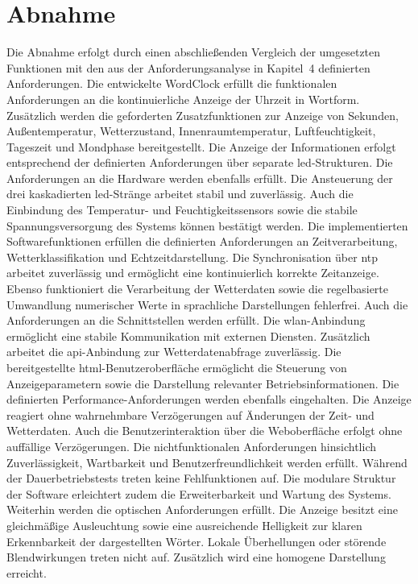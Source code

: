\section{Abnahme}
Die Abnahme erfolgt durch einen abschließenden Vergleich der umgesetzten Funktionen mit den aus der Anforderungsanalyse in Kapitel~4 definierten Anforderungen.
Die entwickelte WordClock erfüllt die funktionalen Anforderungen an die kontinuierliche Anzeige der Uhrzeit in Wortform.  
Zusätzlich werden die geforderten Zusatzfunktionen zur Anzeige von Sekunden, Außentemperatur, Wetterzustand, Innenraumtemperatur, Luftfeuchtigkeit, Tageszeit und Mondphase bereitgestellt.  
Die Anzeige der Informationen erfolgt entsprechend der definierten Anforderungen über separate \gls{led}-Strukturen.  
Die Anforderungen an die Hardware werden ebenfalls erfüllt.  
Die Ansteuerung der drei kaskadierten \gls{led}-Stränge arbeitet stabil und zuverlässig.  
Auch die Einbindung des Temperatur- und Feuchtigkeitssensors sowie die stabile Spannungsversorgung des Systems können bestätigt werden.  
Die implementierten Softwarefunktionen erfüllen die definierten Anforderungen an Zeitverarbeitung, Wetterklassifikation und Echtzeitdarstellung.  
Die Synchronisation über \gls{ntp} arbeitet zuverlässig und ermöglicht eine kontinuierlich korrekte Zeitanzeige.  
Ebenso funktioniert die Verarbeitung der Wetterdaten sowie die regelbasierte Umwandlung numerischer Werte in sprachliche Darstellungen fehlerfrei.  
Auch die Anforderungen an die Schnittstellen werden erfüllt.  
Die \gls{wlan}-Anbindung ermöglicht eine stabile Kommunikation mit externen Diensten.  
Zusätzlich arbeitet die \gls{api}-Anbindung zur Wetterdatenabfrage zuverlässig.  
Die bereitgestellte \gls{html}-Benutzeroberfläche ermöglicht die Steuerung von Anzeigeparametern sowie die Darstellung relevanter Betriebsinformationen.  
Die definierten Performance-Anforderungen werden ebenfalls eingehalten.  
Die Anzeige reagiert ohne wahrnehmbare Verzögerungen auf Änderungen der Zeit- und Wetterdaten.  
Auch die Benutzerinteraktion über die Weboberfläche erfolgt ohne auffällige Verzögerungen.  
Die nichtfunktionalen Anforderungen hinsichtlich Zuverlässigkeit, Wartbarkeit und Benutzerfreundlichkeit werden erfüllt.  
Während der Dauerbetriebstests treten keine Fehlfunktionen auf.  
Die modulare Struktur der Software erleichtert zudem die Erweiterbarkeit und Wartung des Systems.  
Weiterhin werden die optischen Anforderungen erfüllt.  
Die Anzeige besitzt eine gleichmäßige Ausleuchtung sowie eine ausreichende Helligkeit zur klaren Erkennbarkeit der dargestellten Wörter.  
Lokale Überhellungen oder störende Blendwirkungen treten nicht auf.  
Zusätzlich wird eine homogene Darstellung erreicht.  


